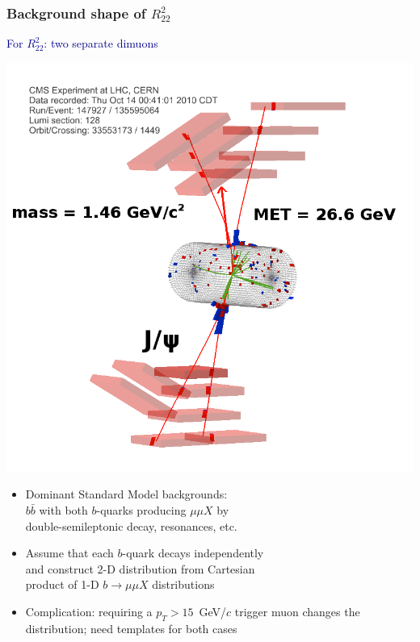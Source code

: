 \documentclass[compress]{beamer}
\begin{document}
\begin{frame}
\frametitle{Background shape of $R^2_{22}$}

\textcolor{darkblue}{For $R^2_{22}$: two separate dimuons}

\vspace{-0.5 cm}
\hfill \mbox{\includegraphics[height=3.5 cm]{dimudimu_control_eventdisplay.png}\hspace{-0.75 cm}}

\vspace{-3.2 cm}
\begin{itemize}
\item Dominant Standard Model backgrounds: \\ $b\bar{b}$ with both
  $b$-quarks producing $\mu\mu X$ by \\ double-semileptonic decay,
  resonances, etc.
\item Assume that each $b$-quark decays independently \\ and construct
  2-D distribution from Cartesian \\ product of 1-D $b\to\mu\mu X$ distributions
\item Complication: requiring a $p_T > 15$~GeV/$c$ trigger muon
  changes the distribution; need templates for both cases
\end{itemize}

\begin{columns}
\centering {}


\end{columns}
\end{frame}
\end{document}

